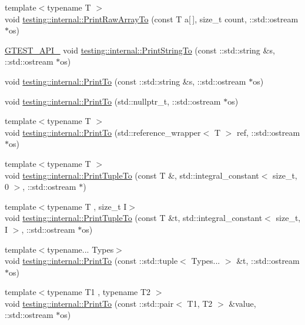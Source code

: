 \begin{DoxyCompactItemize}
{\footnotesize template$<$typename T $>$ }\\void \hyperlink{namespacetesting_1_1internal_ad3013b6b4c825edee9fe18ff1d982faa}{testing\+::internal\+::\+Print\+Raw\+Array\+To} (const T a\mbox{[}$\,$\mbox{]}, size\+\_\+t count, \+::std\+::ostream $\ast$os)
\item 
\hyperlink{gtest-port_8h_aa73be6f0ba4a7456180a94904ce17790}{G\+T\+E\+S\+T\+\_\+\+A\+P\+I\+\_\+} void \hyperlink{namespacetesting_1_1internal_a8b53e46cea3f8bdfc9342057c4f6ba62}{testing\+::internal\+::\+Print\+String\+To} (const \+::std\+::string \&s, \+::std\+::ostream $\ast$os)
\item 
void \hyperlink{namespacetesting_1_1internal_af59b4f5d83276cd807c45063b14bad44}{testing\+::internal\+::\+Print\+To} (const \+::std\+::string \&s, \+::std\+::ostream $\ast$os)
\item 
void \hyperlink{namespacetesting_1_1internal_a76f564cf23190dbd5c9e088defdd092b}{testing\+::internal\+::\+Print\+To} (std\+::nullptr\+\_\+t, \+::std\+::ostream $\ast$os)
\item 
{\footnotesize template$<$typename T $>$ }\\void \hyperlink{namespacetesting_1_1internal_a5587d09db034bc597870ae86bd8c01f8}{testing\+::internal\+::\+Print\+To} (std\+::reference\+\_\+wrapper$<$ T $>$ ref, \+::std\+::ostream $\ast$os)
\item 
{\footnotesize template$<$typename T $>$ }\\void \hyperlink{namespacetesting_1_1internal_a7174fbf5d6ba458afae675022c9aae1e}{testing\+::internal\+::\+Print\+Tuple\+To} (const T \&, std\+::integral\+\_\+constant$<$ size\+\_\+t, 0 $>$, \+::std\+::ostream $\ast$)
\item 
{\footnotesize template$<$typename T , size\+\_\+t I$>$ }\\void \hyperlink{namespacetesting_1_1internal_a3580971ab4571dc9a00f4ed0e17fd777}{testing\+::internal\+::\+Print\+Tuple\+To} (const T \&t, std\+::integral\+\_\+constant$<$ size\+\_\+t, I $>$, \+::std\+::ostream $\ast$os)
\item 
{\footnotesize template$<$typename... Types$>$ }\\void \hyperlink{namespacetesting_1_1internal_a5628347cba9a345f56087fdb70930fc8}{testing\+::internal\+::\+Print\+To} (const \+::std\+::tuple$<$ Types... $>$ \&t, \+::std\+::ostream $\ast$os)
\item 
{\footnotesize template$<$typename T1 , typename T2 $>$ }\\void \hyperlink{namespacetesting_1_1internal_af2c33928facbf2edf7af564278724d98}{testing\+::internal\+::\+Print\+To} (const \+::std\+::pair$<$ T1, T2 $>$ \&value, \+::std\+::ostream $\ast$os)

\end{DoxyCompactItemize}
